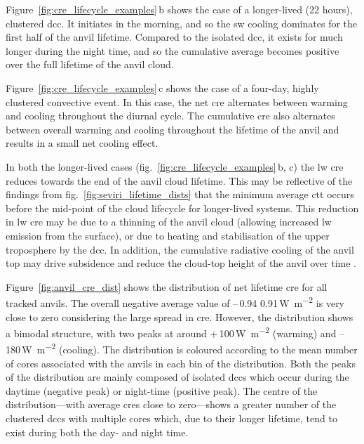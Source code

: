 Figure~\ref{fig:cre_lifecycle_examples}\,b shows the case of a longer-lived (22 hours), clustered \acrshort{dcc}. 
It initiates in the morning, and so the \acrshort{sw} cooling dominates for the first half of the anvil lifetime. 
Compared to the isolated \acrshort{dcc}, it exists for much longer during the night time, and so the cumulative average becomes positive over the full lifetime of the anvil cloud.

Figure~\ref{fig:cre_lifecycle_examples}\,c shows the case of a four-day, highly clustered convective event. 
In this case, the net \acrshort{cre} alternates between warming and cooling throughout the diurnal cycle. 
The cumulative \acrshort{cre} also alternates between overall warming and cooling throughout the lifetime of the anvil and results in a small net cooling effect.

In both the longer-lived cases (fig.~\ref{fig:cre_lifecycle_examples}\,b, c) the \acrshort{lw} \acrshort{cre} reduces towards the end of the anvil cloud lifetime. 
This may be reflective of the findings from fig.~\ref{fig:seviri_lifetime_dists} that the minimum average \acrshort{ctt} occurs before the mid-point of the cloud lifecycle for longer-lived systems. 
This reduction in \acrshort{lw} \acrshort{cre} may be due to a thinning of the anvil cloud (allowing increased \acrshort{lw} emission from the surface), or due to heating and stabilisation of the upper troposphere by the \acrshort{dcc}.
In addition, the cumulative radiative cooling of the anvil top may drive subsidence and reduce the cloud-top height of the anvil over time \citep{sokol_tropical_2020}.

Figure~\ref{fig:anvil_cre_dist} shows the distribution of net lifetime \acrshort{cre} for all tracked anvils. 
The overall negative average value of --\,0.94\,\textpm\,0.91\,\unit{W m^{-2}} is very close to zero considering the large spread in \acrshort{cre}. 
However, the distribution shows a bimodal structure, with two peaks at around +\,100\,\unit{W m^{-2}} (warming) and --\,180\,\unit{W m^{-2}} (cooling). 
The distribution is coloured according to the mean number of cores associated with the anvils in each bin of the distribution. 
Both the peaks of the distribution are mainly composed of isolated \acrshort{dcc}s which occur during the daytime (negative peak) or night-time (positive peak). 
The centre of the distribution---with average \acrshort{cre}s close to zero---shows a greater number of the clustered \acrshort{dcc}s with multiple cores which, due to their longer lifetime, tend to exist during both the day- and night time.


